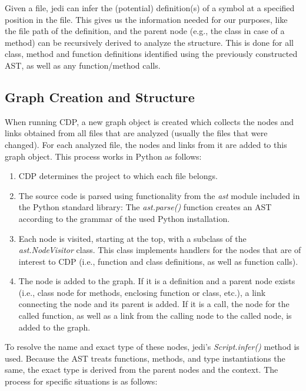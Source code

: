 \documentclass[a4paper,11pt,twoside]{article}
\theoremstyle{definition} %
\begin{document}
Given a file, jedi can infer the (potential) definition(s) of a symbol at a specified position in the file. This gives us the information needed for our purposes, like the file path of the definition, and the parent node (e.g., the class in case of a method) can be recursively derived to analyze the structure. This is done for all class, method and function definitions identified using the previously constructed AST, as well as any function/method calls. 


\subsection{Graph Creation and Structure} \label{SubSec:GraphStruc}

When running CDP, a new graph object is created which collects the nodes and links obtained from all files that are analyzed (usually the files that were changed). For each analyzed file, the nodes and links from it are added to this graph object. This process works in Python as follows: 

\begin{enumerate}
    \item CDP determines the project to which each file belongs.
    \item The source code is parsed using functionality from the \textit{ast} module included in the Python standard library: The \textit{ast.parse()} function creates an AST according to the grammar of the used Python installation.
    \item Each node is visited, starting at the top, with a subclass of the \textit{ast.NodeVisitor} class. This class implements handlers for the nodes that are of interest to CDP (i.e., function and class definitions, as well as function calls).
    \item The node is added to the graph. If it is a definition and a parent node exists (i.e., class node for methods, enclosing function or class, etc.), a link connecting the node and its parent is added. If it is a call, the node for the called function, as well as a link from the calling node to the called node, is added to the graph.
\end{enumerate}

To resolve the name and exact type of these nodes, jedi’s \textit{Script.infer()} method is used. Because the AST treats functions, methods, and type instantiations the same, the exact type is derived from the parent nodes and the context. The process for specific situations is as follows: 
\end{document}
